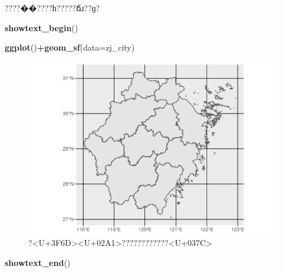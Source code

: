 \documentclass[]{article}
\newenvironment{Shaded}{\begin{snugshade}}{\end{snugshade}}
\newcommand{\DataTypeTok}[1]{\textcolor[rgb]{0.13,0.29,0.53}{#1}}
\newcommand{\KeywordTok}[1]{\textcolor[rgb]{0.13,0.29,0.53}{\textbf{#1}}}
\newcommand{\NormalTok}[1]{#1}
\newcommand{\OperatorTok}[1]{\textcolor[rgb]{0.81,0.36,0.00}{\textbf{#1}}}
\newcommand{\StringTok}[1]{\textcolor[rgb]{0.31,0.60,0.02}{#1}}
\begin{document}
\begin{Shaded}
\end{Shaded}

????��????һ?????ճɹ??ɡ?

\begin{Shaded}
\begin{Highlighting}[]
\KeywordTok{showtext_begin}\NormalTok{()}

\KeywordTok{ggplot}\NormalTok{()}\OperatorTok{+}\KeywordTok{geom_sf}\NormalTok{(}\DataTypeTok{data=}\NormalTok{zj_city)}
\end{Highlighting}
\end{Shaded}

\begin{figure}

{\centering \includegraphics{利用高德地图_files/figure-latex/city_map-1} 

}

\caption{?<U+3F6D><U+02A1>????????????<U+037C>}\label{fig:city_map}
\end{figure}

\begin{Shaded}
\begin{Highlighting}[]
\KeywordTok{showtext_end}\NormalTok{()}
\end{Highlighting}
\end{Shaded}
\end{document}
